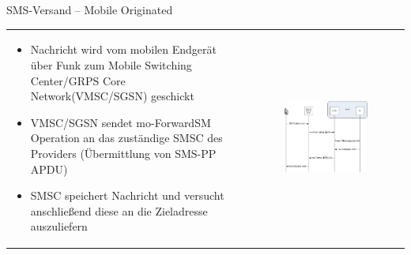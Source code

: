 \documentclass{beamer}
\begin{document}
\begin{frame}{SMS-Versand -- Mobile Originated}

	\begin{tabular}{l l}
		\begin{minipage}{0.6\textwidth}
			\begin{itemize}
				\item Nachricht wird vom mobilen Endgerät über Funk zum Mobile Switching 
					Center/GRPS Core Network(VMSC/SGSN) geschickt
				\item VMSC/SGSN sendet mo-ForwardSM Operation an das zuständige SMSC 
					des Providers (Übermittlung von SMS-PP APDU)
				\item SMSC speichert Nachricht und versucht anschließend diese an die 
					Zieladresse auszuliefern
			\end{itemize}
		\end{minipage}
		&
		\begin{minipage}{0.4\textwidth}
			\begin{figure}[htm]
				\includegraphics[width=\textwidth]{img/mo-forward-sm.png}
				\label{mo-forward-sm}
			\end{figure}	
		\end{minipage}
	\end{tabular}	
\end{frame}
\end{document}
